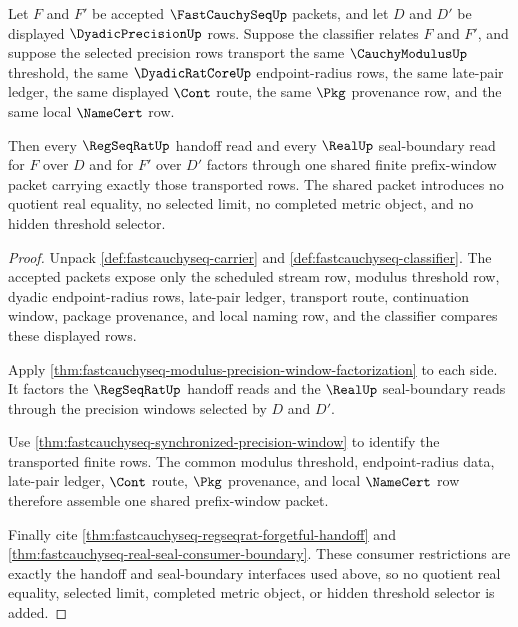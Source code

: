 \begin{theorem}
\label{thm:fastcauchyseq-prefix-window-eventual-lock}
Let $F$ and $F'$ be accepted $\FastCauchySeqUp$ packets, and let $D$ and $D'$
be displayed $\DyadicPrecisionUp$ rows. Suppose the classifier relates $F$ and
$F'$, and suppose the selected precision rows transport the same
$\CauchyModulusUp$ threshold, the same $\DyadicRatCoreUp$ endpoint-radius rows,
the same late-pair ledger, the same displayed $\Cont$ route, the same $\Pkg$
provenance row, and the same local $\NameCert$ row.

Then every $\RegSeqRatUp$ handoff read and every $\RealUp$ seal-boundary read
for $F$ over $D$ and for $F'$ over $D'$ factors through one shared finite
prefix-window packet carrying exactly those transported rows. The shared packet
introduces no quotient real equality, no selected limit, no completed metric
object, and no hidden threshold selector.
\end{theorem}
\begin{proof}
Unpack \autoref{def:fastcauchyseq-carrier} and
\autoref{def:fastcauchyseq-classifier}. The accepted packets expose only the
scheduled stream row, modulus threshold row, dyadic endpoint-radius rows,
late-pair ledger, transport route, continuation window, package provenance, and
local naming row, and the classifier compares these displayed rows.

Apply
\autoref{thm:fastcauchyseq-modulus-precision-window-factorization} to each
side. It factors the $\RegSeqRatUp$ handoff reads and the $\RealUp$
seal-boundary reads through the precision windows selected by $D$ and $D'$.

Use \autoref{thm:fastcauchyseq-synchronized-precision-window} to identify the
transported finite rows. The common modulus threshold, endpoint-radius data,
late-pair ledger, $\Cont$ route, $\Pkg$ provenance, and local $\NameCert$ row
therefore assemble one shared prefix-window packet.

Finally cite \autoref{thm:fastcauchyseq-regseqrat-forgetful-handoff} and
\autoref{thm:fastcauchyseq-real-seal-consumer-boundary}. These consumer
restrictions are exactly the handoff and seal-boundary interfaces used above,
so no quotient real equality, selected limit, completed metric object, or
hidden threshold selector is added.
\end{proof}

